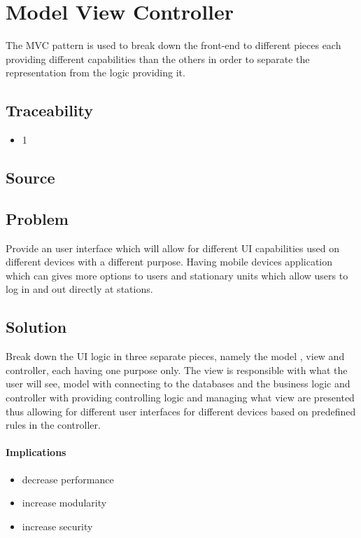 
\section{Model View Controller}
	The MVC pattern is used to break down the front-end to different pieces each providing different capabilities than the others in order to separate the representation from the logic providing it.

	\subsection{Traceability} 
		\begin{itemize}
			\item 1
		\end{itemize}

	\subsection{Source} \cite{book:design-patterns}


	\subsection{Problem}

		Provide an user interface which will allow for different UI capabilities used on different devices with a different purpose. Having mobile devices application which can gives more options to users and stationary units which allow users to log in and out directly at stations.

	\subsection{Solution} 

		Break down the UI logic in three separate pieces, namely the model , view and controller, each having one purpose only. The view is responsible with what the user will see, model with connecting to the databases and the business logic and controller with providing controlling logic and managing what view are presented thus allowing for different user interfaces for different devices based on predefined rules in the controller. 


\paragraph{Implications}
\begin{itemize}
	\item decrease performance
	\item increase modularity
	\item increase security
\end{itemize}
